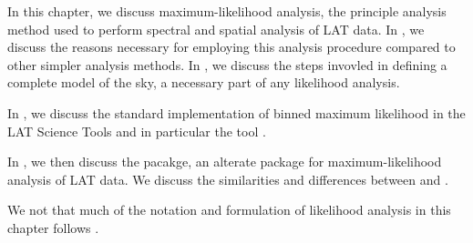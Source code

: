 
In this chapter, we discuss maximum-likelihood analysis, the principle
analysis method used to perform spectral and spatial analysis of
LAT data.  In , we discuss the
reasons necessary for employing this analysis procedure compared to
other simpler analysis methods.  In , we discuss
the steps invovled in defining a complete model of the sky, a necessary
part of any likelihood analysis.

In , we discuss the standard implementation
of binned maximum likelihood in the LAT Science Tools and in particular
the tool \gtlike.

In , we then discuss the \pointlike pacakge,
an alterate package for maximum-likelihood analysis of LAT data. We
discuss the similarities and differences between \pointlike and \gtlike.

We not that much of the notation and formulation of likelihood
analysis in this chapter follows \cite{matthew_kerr_thesis}.


